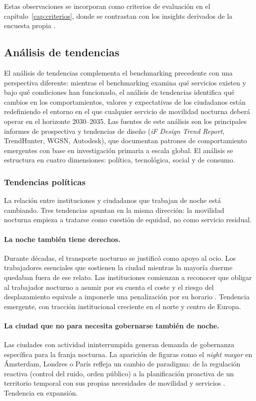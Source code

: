 Estas observaciones se incorporan como criterios
de evaluación en el capítulo~\ref{cap:criterios},
donde se contrastan con los insights derivados de
la encuesta propia \parencite{LouridoRegueira2026}.


\subsection{Análisis de tendencias}
\label{sec:tendencias}

El análisis de tendencias complementa el benchmarking precedente
con una perspectiva diferente: mientras el benchmarking examina
qué servicios existen y bajo qué condiciones han funcionado, el
análisis de tendencias identifica qué cambios en los
comportamientos, valores y expectativas de los ciudadanos están
redefiniendo el entorno en el que cualquier servicio de movilidad
nocturna deberá operar en el horizonte 2030--2035. Las fuentes
de este análisis son los principales informes de prospectiva y
tendencias de diseño (\textit{iF Design Trend Report},
TrendHunter, WGSN, Autodesk), que documentan patrones de
comportamiento emergentes con base en investigación primaria
a escala global. El análisis se estructura en cuatro dimensiones:
política, tecnológica, social y de consumo.

\subsubsection{Tendencias políticas}
\label{sec:tendencias-politicas}

La relación entre instituciones y ciudadanos que trabajan de
noche está cambiando. Tres tendencias apuntan en la misma
dirección: la movilidad nocturna empieza a tratarse como
cuestión de equidad, no como servicio residual.

\paragraph{La noche también tiene derechos.}
Durante décadas, el transporte nocturno se justificó como
apoyo al ocio. Los trabajadores esenciales que sostienen la
ciudad mientras la mayoría duerme quedaban fuera de ese relato.
Las instituciones comienzan a reconocer que obligar al
trabajador nocturno a asumir por su cuenta el coste y el
riesgo del desplazamiento equivale a imponerle una penalización
por su horario \parencite{iF2026}. Tendencia emergente, con
tracción institucional creciente en el norte y centro de Europa.

\paragraph{La ciudad que no para necesita gobernarse también
de noche.}
Las ciudades con actividad ininterrumpida generan demanda de
gobernanza específica para la franja nocturna. La aparición de
figuras como el \textit{night mayor} en Ámsterdam, Londres o
París refleja un cambio de paradigma: de la regulación reactiva
(control del ruido, orden público) a la planificación proactiva
de un territorio temporal con sus propias necesidades de
movilidad y servicios \parencite{URBACTNight2024}. Tendencia
en expansión.


